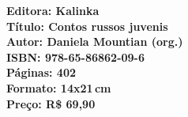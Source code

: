 \vfill

\hspace*{-.4cm}\begin{minipage}[c]{.5\linewidth}
\small\textbf{
\hspace*{-.1cm}Editora: Kalinka\\
Título: Contos russos juvenis\\
Autor: Daniela Mountian (org.)\\ 
ISBN: 978-65-86862-09-6\\
Páginas: 402\\
Formato: 14x21\,cm\\
Preço: R\$ 69,90
}
\end{minipage}

\pagebreak

\vspace*{1.5cm}


\bigskip

\hfill{}

\bigskip
\bigskip
\bigskip

\begin{multicols}{2}
\noindent{}\lipsum[1]

\lipsum[2]

\lipsum[4]

\lipsum[6]


\noindent{}\textcolor{gray}{\footnotesize{}}
\end{multicols}


\pagebreak 

\pagebreak
\pagestyle{kalinkacat}

